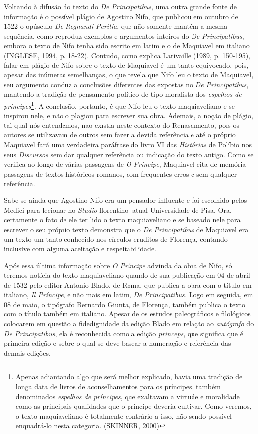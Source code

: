 Voltando à difusão do texto do \emph{De Principatibus}, uma outra grande
fonte de informação é o possível plágio de Agostino Nifo, que publicou
em outubro de 1522 o opúsculo \emph{De Regnandi Peritia}, que não
somente mantém a mesma sequência, como reproduz exemplos e argumentos
inteiros do \emph{De Principatibus}, embora o texto de Nifo tenha sido
escrito em latim e o de Maquiavel em italiano (INGLESE, 1994, p. 18-22).
Contudo, como explica Larivaille (1989, p. 150-195), falar em plágio de
Nifo sobre o texto de Maquiavel é um tanto equivocado, pois, apesar das
inúmeras semelhanças, o que revela que Nifo leu o texto de Maquiavel,
seu argumento conduz a conclusões diferentes das expostas no \emph{De
Principatibus}, mantendo a tradição de pensamento político de tipo
moralista dos \emph{espelhos de príncipes}\footnote{Apenas adiantando
  algo que será melhor explicado, havia uma tradição de longa data de
  livros de aconselhamentos para os príncipes, também denominados
  \emph{espelhos de príncipes}, que exaltavam a virtude e moralidade
  como as principais qualidades que o príncipe deveria cultivar. Como
  veremos, o texto maquiaveliano é totalmente contrário a isso, não
  sendo possível enquadrá-lo nesta categoria. (SKINNER, 2000)}\emph{.} A
conclusão, portanto, é que Nifo leu o texto maquiaveliano e se inspirou
nele, e não o plagiou para escrever sua obra. Ademais, a noção de
plágio, tal qual nós entendemos, não existia neste contexto do
Renascimento, pois os autores se utilizavam de outros sem fazer a devida
referência e até o próprio Maquiavel fará uma verdadeira paráfrase do
livro VI das \emph{Histórias} de Políbio nos seus \emph{Discursos} sem
dar qualquer referência ou indicação do texto antigo. Como se verifica
ao longo de várias passagens de \emph{O Príncipe}, Maquiavel cita de
memória passagens de textos históricos romanos, com frequentes erros e
sem qualquer referência.

Sabe-se ainda que Agostino Nifo era um pensador influente e foi
escolhido pelos Medici para lecionar no \emph{Studio} florentino, atual
Universidade de Pisa. Ora, certamente o fato de ele ter lido o texto
maquiaveliano e se baseado nele para escrever o seu próprio texto
demonstra que o \emph{De Principatibus} de Maquiavel era um texto um
tanto conhecido nos círculos eruditos de Florença, contando inclusive
com alguma aceitação e respeitabilidade.

Após essa última informação sobre \emph{O Príncipe} advinda da obra de
Nifo, só teremos notícia do texto maquiaveliano quando de sua publicação
em 04 de abril de 1532 pelo editor Antonio Blado, de Roma, que publica a
obra com o título em italiano, \emph{Il Príncipe}, e não mais em latim,
\emph{De Principatibus.} Logo em seguida, em 08 de maio, o tipógrafo
Bernardo Giunta, de Florença, também publica o texto com o título também
em italiano. Apesar de os estudos paleográficos e filológicos colocarem
em questão a fidedignidade da edição Blado em relação ao
\emph{autógrafo} do \emph{De Principatibus}, ela é reconhecida como a
edição \emph{princeps}, que significa que é primeira edição e sobre o
qual se deve basear a numeração e referência das demais edições.

